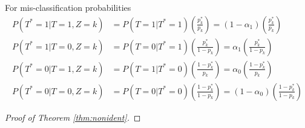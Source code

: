 \documentclass[12pt]{article}
\begin{document}
\begin{lem}
For mis-classification probabilities
\begin{align*}
  P(T^*=1|T=1, Z=k) &= P(T=1 | T^*=1) \left(\frac{p_k^*}{p_k}\right) = (1 - \alpha_1)\left( \frac{p_k^*}{p_k} \right)\\
  P(T^*=1|T=0, Z=k) &= P(T=0 | T^*=1) \left(\frac{p_k^*}{1 - p_k}\right) = \alpha_1 \left( \frac{p_k^*}{1 - p_k} \right)\\
  P(T^*=0|T=1, Z=k) &= P(T=1 | T^*=0) \left(\frac{1 - p_k^*}{p_k}\right) = \alpha_0 \left( \frac{1 - p_k^*}{p_k} \right)\\
  P(T^*=0|T=0, Z=k) &= P(T=0 | T^*=0) \left(\frac{1 - p_k^*}{1 - p_k}\right) = (1 - \alpha_0)\left( \frac{1 - p_k^*}{1 - p_k} \right)
\end{align*}
\end{lem}

\begin{thm}
  \label{thm:nonident}
\end{thm}
\begin{proof}[Proof of Theorem \ref{thm:nonident}]
\end{proof}
\end{document}
